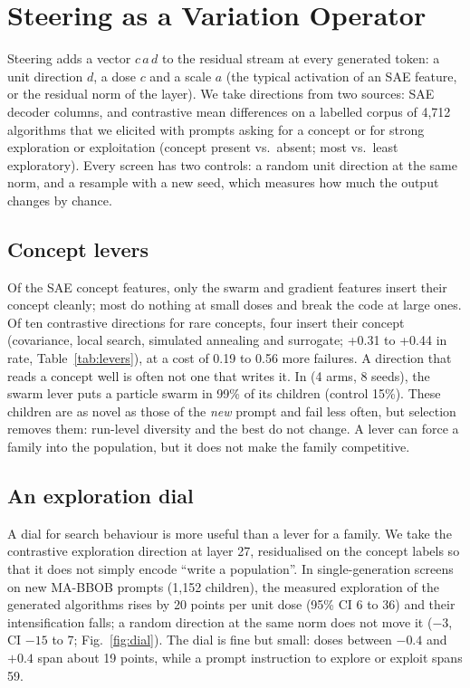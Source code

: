 \section{Steering as a Variation Operator}\label{sec:steering}

Steering adds a vector $c\,a\,d$ to the residual stream at every
generated token: a unit direction $d$, a dose $c$ and a scale $a$ (the
typical activation of an SAE feature, or the residual norm of the
layer). We take directions from two sources: SAE decoder columns, and
contrastive mean differences on a labelled corpus of 4,712 algorithms
that we elicited with prompts asking for a concept or for strong
exploration or exploitation (concept present vs.\ absent; most vs.\ least
exploratory). Every screen has two controls: a random unit direction at
the same norm, and a resample with a new seed, which measures how much
the output changes by chance.

\subsection{Concept levers}
Of the SAE concept features, only the swarm and gradient features
insert their concept cleanly; most do nothing at small doses and break
the code at large ones. Of ten contrastive directions for rare concepts,
four insert their concept (covariance, local search, simulated annealing
and surrogate; +0.31 to +0.44 in rate, Table~\ref{tab:levers}), at a
cost of 0.19 to 0.56 more failures. A direction that reads a concept
well is often not one that writes it. In \llamea (4 arms, 8 seeds), the
swarm lever puts a particle swarm in 99\% of its children (control
15\%). These children are as novel as those of the \emph{new} prompt
and fail less often, but selection removes them: run-level diversity and
the best \aocc do not change. A lever can force a family into the
population, but it does not make the family competitive.

\subsection{An exploration dial}
A dial for search behaviour is more useful than a lever for a family.
We take the contrastive exploration direction at layer 27, residualised
on the concept labels so that it does not simply encode ``write a
population''. In single-generation screens on new MA-BBOB prompts (1,152
children), the measured exploration of the generated algorithms rises by
20 points per unit dose (95\% CI 6 to 36) and their intensification
falls; a random direction at the same norm does not move it ($-3$, CI
$-15$ to 7; Fig.~\ref{fig:dial}). The dial is fine but small: doses
between $-0.4$ and $+0.4$ span about 19 points, while a prompt
instruction to explore or exploit spans 59.

